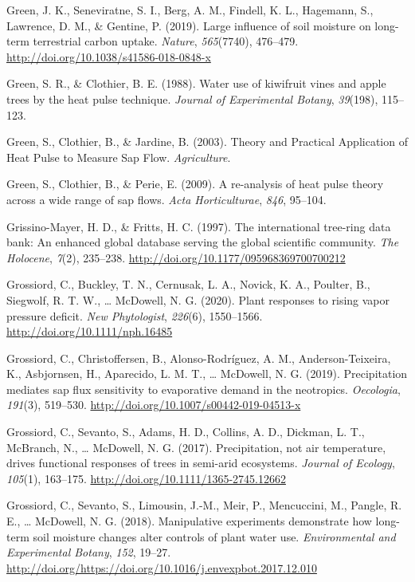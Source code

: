 \documentclass[11pt,twoside]{reedthesis}
\begin{document}
\hypertarget{ref-green_large_2019}{}
Green, J. K., Seneviratne, S. I., Berg, A. M., Findell, K. L., Hagemann,
S., Lawrence, D. M., \& Gentine, P. (2019). Large influence of soil
moisture on long-term terrestrial carbon uptake. \emph{Nature},
\emph{565}(7740), 476--479.
\url{http://doi.org/10.1038/s41586-018-0848-x}

\hypertarget{ref-Green1988}{}
Green, S. R., \& Clothier, B. E. (1988). Water use of kiwifruit vines
and apple trees by the heat pulse technique. \emph{Journal of
Experimental Botany}, \emph{39}(198), 115--123.

\hypertarget{ref-Green2003}{}
Green, S., Clothier, B., \& Jardine, B. (2003). Theory and Practical
Application of Heat Pulse to Measure Sap Flow. \emph{Agriculture}.

\hypertarget{ref-Green2009}{}
Green, S., Clothier, B., \& Perie, E. (2009). A re-analysis of heat
pulse theory across a wide range of sap flows. \emph{Acta
Horticulturae}, \emph{846}, 95--104.

\hypertarget{ref-Henri1997}{}
Grissino-Mayer, H. D., \& Fritts, H. C. (1997). The international
tree-ring data bank: An enhanced global database serving the global
scientific community. \emph{The Holocene}, \emph{7}(2), 235--238.
\url{http://doi.org/10.1177/095968369700700212}

\hypertarget{ref-grossiord_plant_2020}{}
Grossiord, C., Buckley, T. N., Cernusak, L. A., Novick, K. A., Poulter,
B., Siegwolf, R. T. W., \ldots{} McDowell, N. G. (2020). Plant responses
to rising vapor pressure deficit. \emph{New Phytologist}, \emph{226}(6),
1550--1566. \url{http://doi.org/10.1111/nph.16485}

\hypertarget{ref-grossiord2019}{}
Grossiord, C., Christoffersen, B., Alonso-Rodríguez, A. M.,
Anderson-Teixeira, K., Asbjornsen, H., Aparecido, L. M. T., \ldots{}
McDowell, N. G. (2019). Precipitation mediates sap flux sensitivity to
evaporative demand in the neotropics. \emph{Oecologia}, \emph{191}(3),
519--530. \url{http://doi.org/10.1007/s00442-019-04513-x}

\hypertarget{ref-grossiord_precipitation_2017}{}
Grossiord, C., Sevanto, S., Adams, H. D., Collins, A. D., Dickman, L.
T., McBranch, N., \ldots{} McDowell, N. G. (2017). Precipitation, not
air temperature, drives functional responses of trees in semi-arid
ecosystems. \emph{Journal of Ecology}, \emph{105}(1), 163--175.
\url{http://doi.org/10.1111/1365-2745.12662}

\hypertarget{ref-Grossiord2018}{}
Grossiord, C., Sevanto, S., Limousin, J.-M., Meir, P., Mencuccini, M.,
Pangle, R. E., \ldots{} McDowell, N. G. (2018). Manipulative experiments
demonstrate how long-term soil moisture changes alter controls of plant
water use. \emph{Environmental and Experimental Botany}, \emph{152},
19--27.
\url{http://doi.org/https://doi.org/10.1016/j.envexpbot.2017.12.010}
\end{document}
